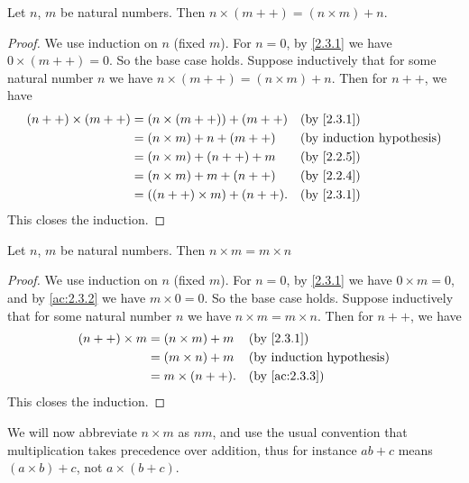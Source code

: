 \begin{ac}\label{ac:2.3.3}
  Let \(n\), \(m\) be natural numbers.
  Then \(n \times (m++) = (n \times m) + n\).
\end{ac}

\begin{proof}
  We use induction on \(n\) (fixed \(m\)).
  For \(n = 0\), by \cref{2.3.1} we have \(0 \times (m++) = 0\).
  So the base case holds.
  Suppose inductively that for some natural number \(n\) we have \(n \times (m++) = (n \times m) + n\).
  Then for \(n++\), we have
  \begin{align*}
    (n++) \times (m++)
     & = (n \times (m++)) + (m++)  &  & \by{2.3.1} \\
     & = (n \times m) + n + (m++)  &  & \byIH      \\
     & = (n \times m) + (n++) + m  &  & \by{2.2.5} \\
     & = (n \times m) + m + (n++)  &  & \by{2.2.4} \\
     & = ((n++) \times m) + (n++). &  & \by{2.3.1}
  \end{align*}
  This closes the induction.
\end{proof}

\begin{lem}\label{2.3.2}
  Let \(n\), \(m\) be natural numbers.
  Then \(n \times m = m \times n\)
\end{lem}

\begin{proof}
  We use induction on \(n\) (fixed \(m\)).
  For \(n = 0\), by \cref{2.3.1} we have \(0 \times m = 0\), and by \cref{ac:2.3.2} we have \(m \times 0 = 0\).
  So the base case holds.
  Suppose inductively that for some natural number \(n\) we have \(n \times m = m \times n\).
  Then for \(n++\), we have
  \begin{align*}
    (n++) \times m & = (n \times m) + m &  & \by{2.3.1}                  \\
                   & = (m \times n) + m &  & \byIH                       \\
                   & = m \times (n++).  &  & \text{(by \cref{ac:2.3.3})}
  \end{align*}
  This closes the induction.
\end{proof}

\begin{note}
  We will now abbreviate \(n \times m\) as \(nm\), and use the usual convention that multiplication takes precedence over addition, thus for instance \(ab + c\) means \((a \times b) + c\), not \(a \times (b + c)\).
\end{note}

